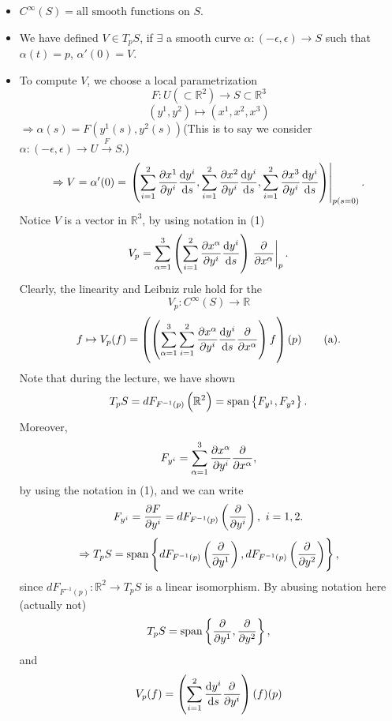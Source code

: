 \begin{enumerate}[(1)]
\begin{itemize}
        \item \(C^\infty(S)={\text{all smooth functions on }S}\).
        \item We have defined \(V\in T_p S\), if \(\exists\) a smooth
        curve \(\alpha\colon (-\epsilon,\epsilon)\to S\) such that
        \(\alpha(t)=p\), \(\alpha'(0)=V\).
        \item To compute \(V\), we choose a local parametrization
        \[F\colon U(\subset \mathbb{R}^2)\to S\subset \mathbb{R}^3\]
        \[(y^1,y^2)\mapsto (x^1,x^2,x^3)\]
        \(\Rightarrow \alpha(s)=F\left(y^1(s),y^2(s)\right)\)(This is to 
        say we consider 
        \(\alpha\colon(-\epsilon,\epsilon)\to U
        \mathop{\longrightarrow }\limits^{F} S\).)\\
        \[
            \Rightarrow V=\alpha'(0)=\left.
            \left(
            \sum_{i=1}^2\pdv{x^1}{y^i}\dv{y^i}{s},
            \sum_{i=1}^2\pdv{x^2}{y^i}\dv{y^i}{s},
            \sum_{i=1}^2\pdv{x^3}{y^i}\dv{y^i}{s}
            \right)
            \right|_{p(s=0)}.
        \]
        Notice \(V\) is a vector in \(\mathbb{R}^3\), by using notation
        in (1)
        \[
            V_p=\sum_{\alpha=1}^3\left(\sum_{i=1}^2\pdv{x^\alpha}{y^i}
            \dv{y^i}{s}\right)\left. \pdv{x^\alpha}  \right|_p.
        \]
        Clearly, the linearity and Leibniz rule hold for the 
        \[
            V_p\colon C^\infty(S)\to \mathbb{R}    
        \]
        \[
            f\mapsto V_p(f)=\left(\left(\sum_{\alpha=1}^3 \sum_{i=1}
            ^2 \pdv{x^\alpha}{y^i}\dv{y^i}{s}\pdv{x^\alpha}\right)f\right)
            (p)   \tag{a} 
        .\]
        Note that during the lecture, we have shown
        \[
            T_pS=dF_{F^{-1}(p)}\left(\mathbb{R}^2\right)=\operatorname{span}
            \left\{F_{y^1},F_{y^2}\right\}    .
        \]
        Moreover, 
        \[
            F_{y^i}=\sum_{\alpha=1}^3\pdv{x^\alpha}{y^i}\pdv
            {x^\alpha},
        \] 
        by using the notation in (1), and we can write
        \[
            F_{y^i}=\pdv{F}{y^i}=dF_{F^{-1}(p)}\left(\pdv{y^i}\right),
            ~i=1,2.
        \]
        \[
            \Rightarrow T_p S=\operatorname{span}\left\{
                dF_{F^{-1}(p)}\left(\pdv{y^1}\right),
                dF_{F^{-1}(p)}\left(\pdv{y^2}\right)
            \right\}  ,
        \]
        since \(dF_{F^{-1}(p)}\colon \mathbb{R}^2\to T_p S\) is a linear
        isomorphism. By abusing notation here (actually not)
        \[
            T_p S=\operatorname{span} \left\{\pdv{y^1},\pdv{y^2}\right\}    
        ,\]
        and 
        \[
            V_p (f)=\left(\sum_{i=1}^2\dv{y^i}{s}\pdv{y^i}\right)(f)(p)    
\]
\end{itemize}
\end{enumerate}
